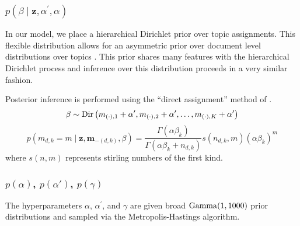 


\subsubsection{$p\left(\beta\mid\mathbf{z},\alpha^{\prime},\alpha\right)$}

In our model, we place a hierarchical Dirichlet prior over topic assignments.
This flexible distribution allows for an asymmetric prior over document
level distributions over topics \citep{WallachMiMc2009}. This prior
shares many features with the hierarchical Dirichlet process and inference
over this distribution proceeds in a very similar fashion.

Posterior inference is performed using the {}``direct assignment''
method of \citet{TehJorBea2006}. \begin{equation}
\beta\sim{\rm Dir}\left(m_{\left(\cdot\right),1}+\alpha^{\prime},m_{\left(\cdot\right),2}+\alpha^{\prime},\ldots,m_{\left(\cdot\right),K}+\alpha^{\prime}\right)\end{equation}
 \begin{equation}
p\left(m_{d,k}=m\mid\mathbf{z},\mathbf{m}_{-\left(d,k\right)},\beta\right)=\frac{\Gamma\left(\alpha\beta_{k}\right)}{\Gamma\left(\alpha\beta_{k}+n_{d,k}\right)}s\left(n_{d,k},m\right)\left(\alpha\beta_{k}\right)^{m}\end{equation}
 where $s\left(n,m\right)$ represents stirling numbers of the first
kind. 


\subsubsection{$p\left(\alpha\right)$, $p\left(\alpha'\right)$, $p\left(\gamma\right)$}

The hyperparameters $\alpha$, $\alpha^{\prime}$, and $\gamma$ are
given broad ${\rm Gamma}(1,1000)$ prior distributions and sampled
via the Metropolis-Hastings algorithm. 


